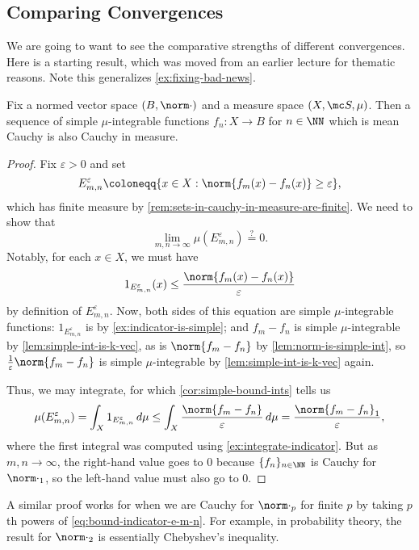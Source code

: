 \documentclass[../notes.tex]{subfiles}
\begin{document}
\subsection{Comparing Convergences}
We are going to want to see the comparative strengths of different convergences. Here is a starting result, which was moved from an earlier lecture for thematic reasons. Note this generalizes \autoref{ex:fixing-bad-news}.
\begin{lemma} \label{lem:mean-cauchy-is-cauchy-in-measure}
	Fix a normed vector space $(B,\norm\cdot)$ and a measure space $(X,\mc S,\mu)$. Then a sequence of simple $\mu$-integrable functions $f_n\colon X\to B$ for $n\in\NN$ which is mean Cauchy is also Cauchy in measure.
\end{lemma}
\begin{proof}
	Fix $\varepsilon>0$ and set
	\[E^\varepsilon_{m,n}\coloneqq\{x\in X:\norm{f_m(x)-f_n(x)}\ge\varepsilon\},\]
	which has finite measure by \autoref{rem:sets-in-cauchy-in-measure-are-finite}. We need to show that
	\[\lim_{m,n\to\infty}\mu(E_{m,n}^\varepsilon)\stackrel?=0.\]
	Notably, for each $x\in X$, we must have
	\begin{equation}
		1_{E^\varepsilon_{m,n}}(x)\le\frac{\norm{f_m(x)-f_n(x)}}\varepsilon \label{eq:bound-indicator-e-m-n}
	\end{equation}
	by definition of $E^{\varepsilon}_{m,n}$. Now, both sides of this equation are simple $\mu$-integrable functions: $1_{E^\varepsilon_{m,n}}$ is by \autoref{ex:indicator-is-simple}; and $f_m-f_n$ is simple $\mu$-integrable by \autoref{lem:simple-int-is-k-vec}, as is $\norm{f_m-f_n}$ by \autoref{lem:norm-is-simple-int}, so $\frac1\varepsilon\norm{f_m-f_n}$ is simple $\mu$-integrable by \autoref{lem:simple-int-is-k-vec} again.
	
	Thus, we may integrate, for which \autoref{cor:simple-bound-ints} tells us
	\[\mu(E^\varepsilon_{m,n})=\int_X1_{E^{\varepsilon}_{m,n}}\,d\mu\le\int_X\frac{\norm{f_m-f_n}}\varepsilon\,d\mu=\frac{\norm{f_m-f_n}_1}\varepsilon,\]
	where the first integral was computed using \autoref{ex:integrate-indicator}. But as $m,n\to\infty$, the right-hand value goes to $0$ because $\{f_n\}_{n\in\NN}$ is Cauchy for $\norm\cdot_1$, so the left-hand value must also go to $0$.
\end{proof}
\begin{remark}
	A similar proof works for when we are Cauchy for $\norm\cdot_p$ for finite $p$ by taking $p$th powers of \autoref{eq:bound-indicator-e-m-n}. For example, in probability theory, the result for $\norm\cdot_2$ is essentially Chebyshev's inequality.
\end{remark}
\end{document}
